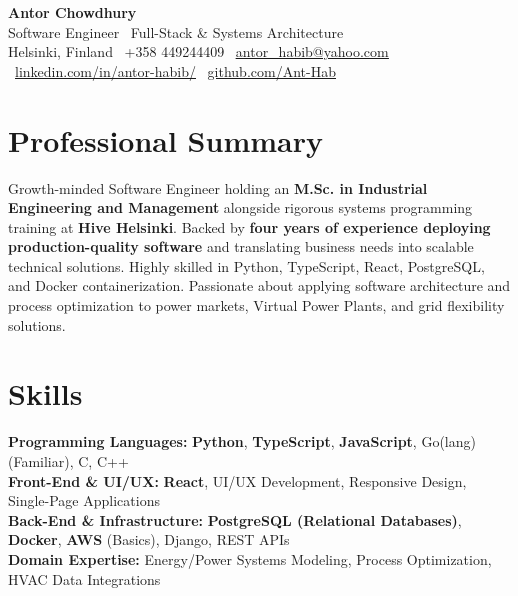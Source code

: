 \documentclass[a4paper,11pt]{article}
\begin{document}
\vspace*{2pt}

\begin{center}
    {\Huge {}\selectfont \textbf{Antor Chowdhury}} \\[4pt]
    {\large {}\selectfont Software Engineer \textbar\ Full-Stack \& Systems Architecture} \\[4pt]
    \small
    Helsinki, Finland \textbar\ +358 449244409 \textbar\ 
    \href{mailto:antor_habib@yahoo.com}{\underline{antor\_habib@yahoo.com}} \textbar\ 
    \href{https://www.linkedin.com/in/antor-habib/}{\underline{linkedin.com/in/antor-habib/}} \textbar\ 
    \href{https://github.com/Ant-Hab}{\underline{github.com/Ant-Hab}}
\end{center}

\vspace{0pt}

\section{Professional Summary}
\begin{justify}
\small{
Growth-minded Software Engineer holding an \textbf{M.Sc. in Industrial Engineering and Management} alongside rigorous systems programming training at \textbf{Hive Helsinki}. Backed by \textbf{four years of experience deploying production-quality software} and translating business needs into scalable technical solutions. Highly skilled in Python, TypeScript, React, PostgreSQL, and Docker containerization. Passionate about applying software architecture and process optimization to power markets, Virtual Power Plants, and grid flexibility solutions.
}
\end{justify}

\vspace{-6pt}

\section{Skills}
\begin{itemize}[leftmargin=0.15in, label={}, itemsep=0pt, topsep=1pt]
\small{\item{
\textbf{Programming Languages:} \textbf{Python}, \textbf{TypeScript}, \textbf{JavaScript}, Go(lang) (Familiar), C, C++ \\
\textbf{Front-End \& UI/UX:} \textbf{React}, UI/UX Development, Responsive Design, Single-Page Applications \\
\textbf{Back-End \& Infrastructure:} \textbf{PostgreSQL (Relational Databases)}, \textbf{Docker}, \textbf{AWS} (Basics), Django, REST APIs \\
\textbf{Domain Expertise:} Energy/Power Systems Modeling, Process Optimization, HVAC Data Integrations
}}
\end{itemize}
\end{document}
